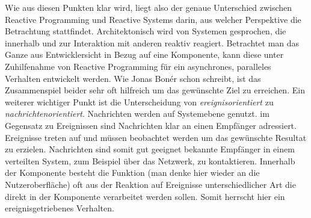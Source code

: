 Wie aus diesen Punkten klar wird, liegt also der genaue Unterschied zwischen Reactive Programming und Reactive Systems darin, aus welcher Perspektive die Betrachtung stattfindet. Architektonisch wird von Systemen gesprochen, die innerhalb und zur Interaktion mit anderen reaktiv reagiert. Betrachtet man das Ganze aus Entwicklersicht in Bezug auf eine Komponente, kann diese unter Zuhilfenahme von Reactive Programming für ein asynchrones, paralleles Verhalten entwickelt werden. Wie Jonas Bonér schon schreibt, ist das Zusammenspiel beider sehr oft hilfreich um das gewünschte Ziel zu erreichen. Ein weiterer wichtiger Punkt ist die Unterscheidung von \textit{ereignisorientiert} zu \textit{nachrichtenorientiert}. Nachrichten werden auf Systemebene genutzt. im Gegensatz zu Ereignissen sind Nachrichten klar an einen Empfänger adressiert. Ereignisse treten auf und müssen beobachtet werden um das gewünschte Resultat zu erzielen. Nachrichten sind somit gut geeignet bekannte Empfänger in einem verteilten System, zum Beispiel über das Netzwerk, zu kontaktieren. Innerhalb der Komponente besteht die Funktion (man denke hier wieder an die Nutzeroberfläche) oft aus der Reaktion auf Ereignisse unterschiedlicher Art die direkt in der Komponente verarbeitet werden sollen. Somit herrscht hier ein ereignisgetriebenes  Verhalten. 

